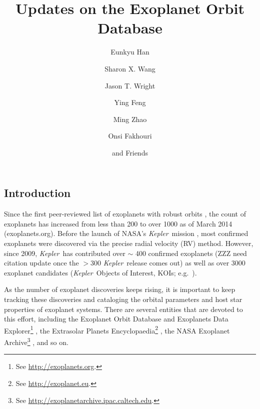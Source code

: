 \documentclass[11pt,preprint]{aastex}
\def\kepler{\textit{Kepler}}
\begin{document}
\begin{CJK*}{UTF8}{gbsn}

\title{Updates on the Exoplanet Orbit Database}

\author{Eunkyu Han}
\author{Sharon X. Wang}
\author{Jason T. Wright}
\author{Ying Feng}
\author{Ming Zhao}
\author{Onsi Fakhouri}
\author{and Friends}



\begin{abstract}

\end{abstract}  

\section{Introduction}\label{sec:intro}

Since the first peer-reviewed list of exoplanets with robust orbits
\citep{Butler2002,Butler2006}, the count of exoplanets has increased
from less than 200 to over 1000 as of March 2014
(exoplanets.org). Before the launch of NASA's \kepler\ mission
\citep{Borucki2010}, most confirmed exoplanets were discovered via the
precise radial velocity (RV) method. However, since 2009, \kepler\ has
contributed over $\sim$ 400 confirmed exoplanets (ZZZ need citation
update once the $>300$ \kepler\ release comes out) as well as over
3000 exoplanet candidates (\kepler\ Objects of Interest, KOIs;
e.g.~\citealt{Batalha2013}).

As the number of exoplanet discoveries keeps rising, it is important
to keep tracking these discoveries and cataloging the orbital
parameters and host star properties of exoplanet systems. There are
several entities that are devoted to this effort, including the
Exoplanet Orbit Database and Exoplanets Data Explorer\footnote{See
  \url{http://exoplanets.org}.} \citep{Wright2011}, the Extrasolar
Planets Encyclopaedia\footnote{See \url{http://exoplanet.eu}.}
\citep{Schneider2011}, the NASA Exoplanet Archive\footnote{See
  \url{http://exoplanetarchive.ipac.caltech.edu}.}
\citep{Akeson2013}, and so on.


\end{CJK*}
\end{document}
